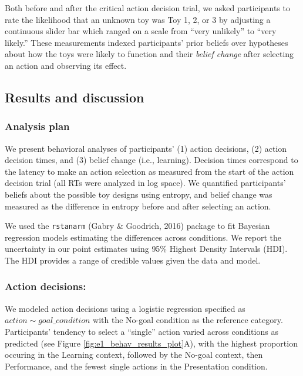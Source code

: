 \documentclass[10pt, letterpaper]{article}
\begin{document}
Both before and after the critical action decision trial, we asked
participants to rate the likelihood that an unknown toy was Toy 1, 2, or
3 by adjusting a continuous slider bar which ranged on a scale from
``very unlikely'' to ``very likely.'' These measurements indexed
participants' prior beliefs over hypotheses about how the toys were
likely to function and their \emph{belief change} after selecting an
action and observing its effect.

\subsection{Results and discussion}\label{results-and-discussion}

\subsubsection{Analysis plan}\label{analysis-plan}

We present behavioral analyses of participants' (1) action decisions,
(2) action decision times, and (3) belief change (i.e., learning).
Decision times correspond to the latency to make an action selection as
measured from the start of the action decision trial (all RTs were
analyzed in log space). We quantified participants' beliefs about the
possible toy designs using entropy, and belief change was measured as
the difference in entropy before and after selecting an action.

We used the \texttt{rstanarm} (Gabry \& Goodrich, 2016) package to fit
Bayesian regression models estimating the differences across conditions.
We report the uncertainty in our point estimates using 95\% Highest
Density Intervals (HDI). The HDI provides a range of credible values
given the data and model.

\subsubsection{Action decisions:}\label{action-decisions}

We modeled action decisions using a logistic regression specified as
\texttt{$action \sim goal\_condition$} with the No-goal condition as the
reference category. Participants' tendency to select a ``single'' action
varied across conditions as predicted (see Figure
\ref{fig:e1_behav_results_plot}A), with the highest proportion occuring
in the Learning context, followed by the No-goal context, then
Performance, and the fewest single actions in the Presentation
condition.
\end{document}
